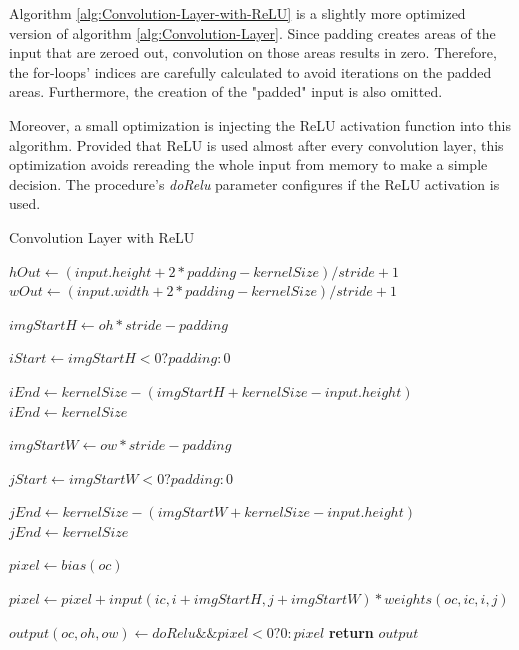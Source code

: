 Algorithm \ref{alg:Convolution-Layer-with-ReLU} is a slightly more optimized version of algorithm \ref{alg:Convolution-Layer}. Since padding creates areas of the input that are zeroed out, convolution on those areas results in zero. Therefore, the for-loops' indices are carefully calculated to avoid iterations on the padded areas. Furthermore, the creation of the "padded" input is also omitted.

Moreover, a small optimization is injecting the ReLU activation function into this algorithm. Provided that ReLU is used almost after every convolution layer, this optimization avoids rereading the whole input from memory to make a simple decision. The procedure's \textit{doRelu} parameter configures if the ReLU activation is used.

\begin{algorithm}[H]
	\caption{Convolution Layer with ReLU}\label{alg:Convolution-Layer-with-ReLU}
	\begin{algorithmic}[1]
			\State $hOut \gets (input.height +2 * padding - kernelSize) / stride + 1$
			\State $wOut \gets (input.width +2 * padding - kernelSize) / stride + 1$

			 

					\State $imgStartH \gets oh * stride - padding$

					\State $iStart \gets imgStartH < 0 ? padding : 0$

						\State $iEnd \gets kernelSize - (imgStartH + kernelSize - input.height)$
					\Else{}
						\State $iEnd \gets kernelSize$
					\EndIf

						\State $imgStartW \gets ow * stride - padding$

						\State $jStart \gets imgStartW < 0 ? padding : 0$

							\State $jEnd \gets kernelSize - (imgStartW + kernelSize - input.height)$
						\Else{}
							\State $jEnd \gets kernelSize$
						\EndIf

						\State $pixel \gets bias(oc)$

									\State $pixel \gets pixel + input(ic, i + imgStartH, j + imgStartW) * weights(oc, ic, i, j)$
								\EndFor
							\EndFor
						\EndFor

						\State $output(oc, oh, ow) \gets doRelu \&\& pixel < 0 ? 0 : pixel$
					\EndFor
				\EndFor
			\EndFor
			\State \textbf{return} $output$
		\EndProcedure
	\end{algorithmic}
\end{algorithm}

